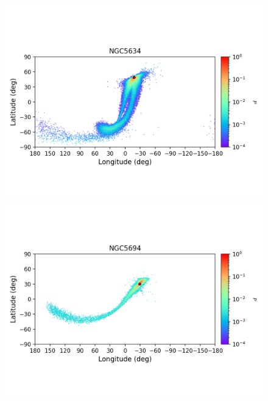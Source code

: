 \begin{figure}
\begin{center}
                \includegraphics[clip=true, trim = 0mm 20mm 0mm 10mm, width=1\columnwidth]{images/error_plots_NGC5634.png}
                \includegraphics[clip=true, trim = 0mm 20mm 0mm 10mm, width=1\columnwidth]{images/error_plots_NGC5694.png}
                

\end{center}
\end{figure}
